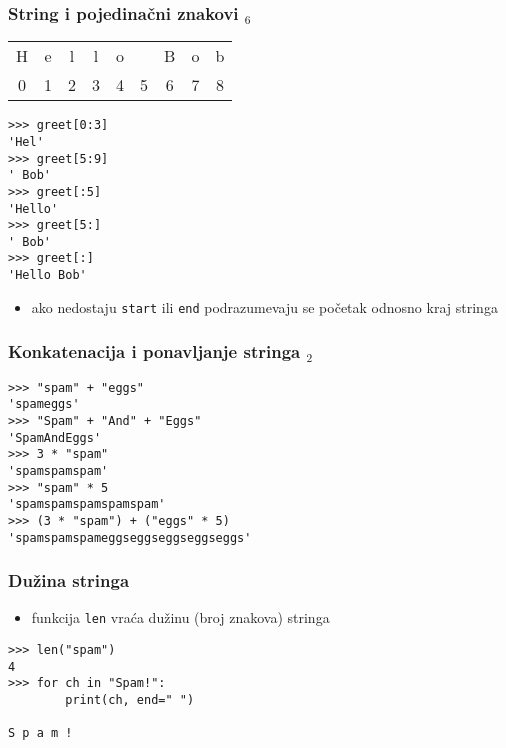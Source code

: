 \documentclass[utf8,compress]{beamer}
\begin{document}
\begin{frame}[fragile]
  \frametitle{String i pojedinačni znakovi $_6$}
\begin{tabular}{|c|c|c|c|c|c|c|c|c|}
\cline{1-9}
H & e & l & l & o & \  & B & o & b \\ \cline{1-9}
\multicolumn{1}{c}{0} & \multicolumn{1}{c}{1} & \multicolumn{1}{c}{2} & \multicolumn{1}{c}{3} & \multicolumn{1}{c}{4} & \multicolumn{1}{c}{5} & \multicolumn{1}{c}{6} & \multicolumn{1}{c}{7} & \multicolumn{1}{c}{8}
\end{tabular}
\begin{verbatim}
>>> greet[0:3]
'Hel'
>>> greet[5:9]
' Bob'
>>> greet[:5]
'Hello'
>>> greet[5:]
' Bob'
>>> greet[:]
'Hello Bob'
\end{verbatim}
  \begin{itemize}
    \item ako nedostaju \texttt{start} ili \texttt{end} podrazumevaju se početak odnosno kraj stringa
  \end{itemize}
\end{frame}


\begin{frame}[fragile]
  \frametitle{Konkatenacija i ponavljanje stringa $_2$}
\begin{verbatim}
>>> "spam" + "eggs"
'spameggs'
>>> "Spam" + "And" + "Eggs"
'SpamAndEggs'
>>> 3 * "spam"
'spamspamspam'
>>> "spam" * 5
'spamspamspamspamspam'
>>> (3 * "spam") + ("eggs" * 5)
'spamspamspameggseggseggseggseggs'
\end{verbatim}
\end{frame}

\begin{frame}[fragile]
  \frametitle{Dužina stringa}
  \begin{itemize}
    \item funkcija \texttt{len} vraća dužinu (broj znakova) stringa
  \end{itemize}
\begin{verbatim}
>>> len("spam")
4
>>> for ch in "Spam!":
        print(ch, end=" ")

S p a m !
\end{verbatim}
\end{frame}
\end{document}
